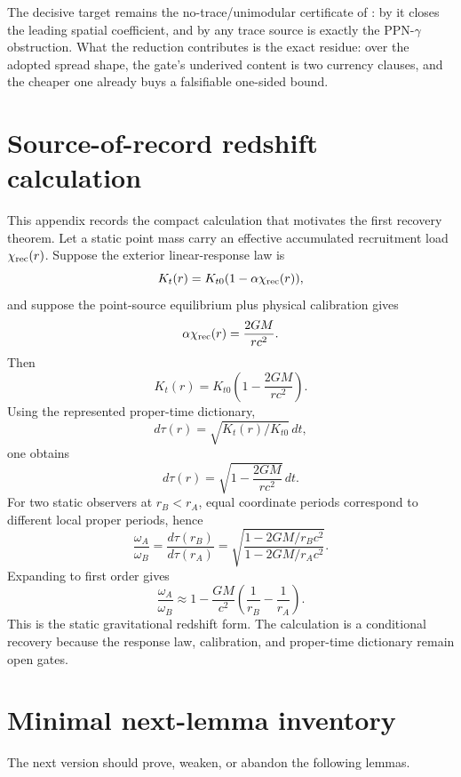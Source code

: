 \documentclass[11pt]{article}
\theoremstyle{remark}
\begin{document}
The decisive target remains the no-trace/unimodular certificate of : by  it closes the leading spatial coefficient, and by  any trace source is exactly the PPN-\(\gamma\) obstruction.  What the reduction contributes is the exact residue: over the adopted spread shape, the gate's underived content is two currency clauses, and the cheaper one already buys a falsifiable one-sided bound.


\section{Source-of-record redshift calculation}

This appendix records the compact calculation that motivates the first recovery theorem.  Let a static point mass carry an effective accumulated recruitment load \(\chi_{\rm rec}(r)\).  Suppose the exterior linear-response law is
\[
        K_t(r)=K_{t0}(1-\alpha\chi_{\rm rec}(r)),
\]
and suppose the point-source equilibrium plus physical calibration gives
\[
        \alpha\chi_{\rm rec}(r)=\frac{2GM}{rc^2}.
\]
Then
\[
        K_t(r)=K_{t0}\left(1-\frac{2GM}{rc^2}\right).
\]
Using the represented proper-time dictionary,
\[
        d\tau(r)=\sqrt{K_t(r)/K_{t0}}\,dt,
\]
one obtains
\[
        d\tau(r)=\sqrt{1-\frac{2GM}{rc^2}}\,dt.
\]
For two static observers at \(r_B<r_A\), equal coordinate periods correspond to different local proper periods, hence
\[
        \frac{\omega_A}{\omega_B}
        =\frac{d\tau(r_B)}{d\tau(r_A)}
        =\sqrt{\frac{1-2GM/r_Bc^2}{1-2GM/r_Ac^2}}.
\]
Expanding to first order gives
\[
        \frac{\omega_A}{\omega_B}
        \approx
        1-\frac{GM}{c^2}\left(\frac1{r_B}-\frac1{r_A}\right).
\]
This is the static gravitational redshift form.  The calculation is a conditional recovery because the response law, calibration, and proper-time dictionary remain open gates.

\section{Minimal next-lemma inventory}

The next version should prove, weaken, or abandon the following lemmas.
\end{document}
